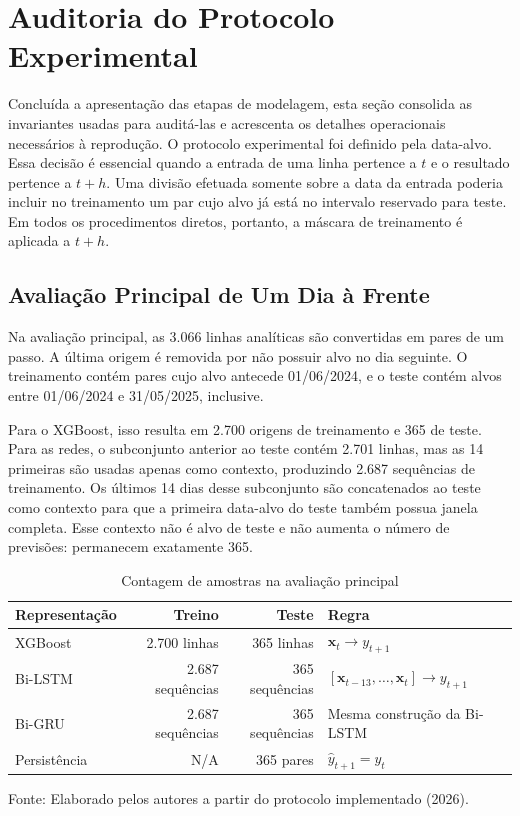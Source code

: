 \section{Auditoria do Protocolo Experimental}\label{sec:protocolo_detalhado}

Concluída a apresentação das etapas de modelagem, esta seção consolida as invariantes usadas para auditá-las e acrescenta os detalhes operacionais necessários à reprodução. O protocolo experimental foi definido pela data-alvo. Essa decisão é essencial quando a entrada de uma linha pertence a $t$ e o resultado pertence a $t+h$. Uma divisão efetuada somente sobre a data da entrada poderia incluir no treinamento um par cujo alvo já está no intervalo reservado para teste. Em todos os procedimentos diretos, portanto, a máscara de treinamento é aplicada a $t+h$.

\subsection{Avaliação Principal de Um Dia à Frente}

Na avaliação principal, as 3.066 linhas analíticas são convertidas em pares de um passo. A última origem é removida por não possuir alvo no dia seguinte. O treinamento contém pares cujo alvo antecede 01/06/2024, e o teste contém alvos entre 01/06/2024 e 31/05/2025, inclusive.

Para o XGBoost, isso resulta em 2.700 origens de treinamento e 365 de teste. Para as redes, o subconjunto anterior ao teste contém 2.701 linhas, mas as 14 primeiras são usadas apenas como contexto, produzindo 2.687 sequências de treinamento. Os últimos 14 dias desse subconjunto são concatenados ao teste como contexto para que a primeira data-alvo do teste também possua janela completa. Esse contexto não é alvo de teste e não aumenta o número de previsões: permanecem exatamente 365.

\begin{table}[H]
\centering
\caption{Contagem de amostras na avaliação principal}
\label{tab:contagem_avaliacao_principal}
\small
\begin{tabularx}{\textwidth}{p{3.2cm} r r X}
\toprule
\textbf{Representação} & \textbf{Treino} & \textbf{Teste} & \textbf{Regra} \\
\midrule
XGBoost & 2.700 linhas & 365 linhas & $\mathbf{x}_t\rightarrow y_{t+1}$ \\
Bi-LSTM & 2.687 sequências & 365 sequências & $[\mathbf{x}_{t-13},\ldots,\mathbf{x}_t]\rightarrow y_{t+1}$ \\
Bi-GRU & 2.687 sequências & 365 sequências & Mesma construção da Bi-LSTM \\
Persistência & N/A & 365 pares & $\widehat y_{t+1}=y_t$ \\
\bottomrule
\end{tabularx}
\small{Fonte: Elaborado pelos autores a partir do protocolo implementado (2026).}
\end{table}

